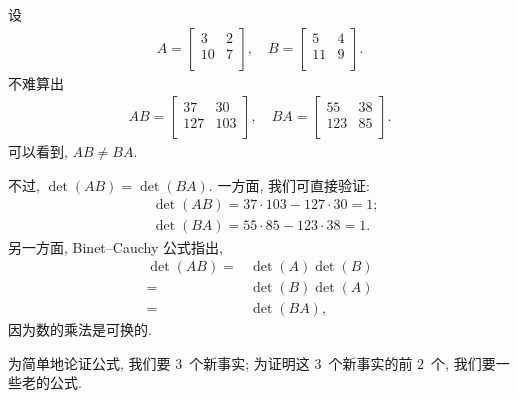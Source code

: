 \documentclass[../libro.tex]{subfiles}
\begin{document}
\begin{example}
    设
    \begin{align*}
        A =
        \begin{bmatrix}
            3  & 2 \\
            10 & 7 \\
        \end{bmatrix},
        \quad
        B =
        \begin{bmatrix}
            5  & 4 \\
            11 & 9 \\
        \end{bmatrix}.
    \end{align*}
    不难算出
    \begin{align*}
        AB =
        \begin{bmatrix}
            37  & 30  \\
            127 & 103 \\
        \end{bmatrix},
        \quad
        BA =
        \begin{bmatrix}
            55  & 38 \\
            123 & 85 \\
        \end{bmatrix}.
    \end{align*}
    可以看到, \(AB \neq BA\).

    不过, \(\det {(AB)} = \det {(BA)}\).
    一方面, 我们可直接验证:
    \begin{align*}
        & \det {(AB)} = 37 \cdot 103 - 127 \cdot 30 = 1; \\
        & \det {(BA)} = 55 \cdot 85 - 123 \cdot 38 = 1.
    \end{align*}
    另一方面, Binet--Cauchy 公式指出,
    \begin{align*}
        \det {(AB)}
        = {} & \det {(A)} \det {(B)} \\
        = {} & \det {(B)} \det {(A)} \\
        = {} & \det {(BA)},
    \end{align*}
    因为数的乘法是可换的.
\end{example}

为简单地论证公式,
我们要 \(3\)~个新事实;
为证明这 \(3\)~个新事实的前 \(2\)~个,
我们要一些老的公式.
\end{document}
